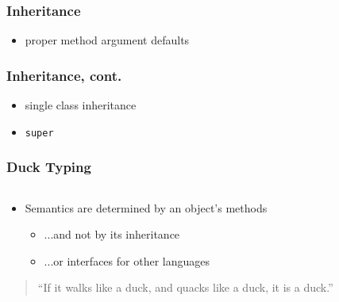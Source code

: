 \begin{frame}[fragile]\frametitle{Inheritance}


\begin{itemize}
\item proper method argument defaults
\end{itemize}
\end{frame}

\begin{frame}[fragile]\frametitle{Inheritance, cont.}


\begin{itemize}
\item single class inheritance
\item \texttt{super}
\end{itemize}
\end{frame}





\begin{frame}[fragile]\frametitle{Duck Typing}

\begin{columns}[c]

\begin{column}{5.5cm}

\begin{itemize}
\item Semantics are determined by an object's methods

\begin{itemize}
\item ...and not by its inheritance
\item ...or interfaces for other languages
\end{itemize}

\end{itemize}

\pause

\begin{quote}
``If it walks like a duck, and quacks like a duck, it is a duck.''
\end{quote}

\end{column}

\pause

\begin{column}{5.5cm}

\end{column}

\end{columns}

\end{frame}




